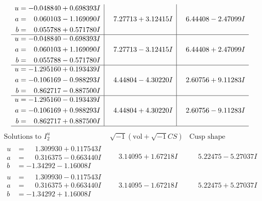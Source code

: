 \documentclass[1p]{elsarticle_modified}
\theoremstyle{definition}
\newcommand{\I}{\sqrt{-1}}
\begin{document}
$$\begin{array}{c|c|c}
\begin{aligned}
u &= -0.048840 + 0.698393 I \\
a &= \phantom{-}0.060103 - 1.169090 I \\
b &= \phantom{-}0.055788 + 0.571780 I\end{aligned}
 & \phantom{-}7.27713 + 3.12415 I & \phantom{-}6.44408 - 2.47099 I \\ \hline\begin{aligned}
u &= -0.048840 - 0.698393 I \\
a &= \phantom{-}0.060103 + 1.169090 I \\
b &= \phantom{-}0.055788 - 0.571780 I\end{aligned}
 & \phantom{-}7.27713 - 3.12415 I & \phantom{-}6.44408 + 2.47099 I \\ \hline\begin{aligned}
u &= -1.295160 + 0.193439 I \\
a &= -0.106169 - 0.988293 I \\
b &= \phantom{-}0.862717 - 0.887500 I\end{aligned}
 & \phantom{-}4.44804 - 4.30220 I & \phantom{-}2.60756 + 9.11283 I \\ \hline\begin{aligned}
u &= -1.295160 - 0.193439 I \\
a &= -0.106169 + 0.988293 I \\
b &= \phantom{-}0.862717 + 0.887500 I\end{aligned}
 & \phantom{-}4.44804 + 4.30220 I & \phantom{-}2.60756 - 9.11283 I\\
 \hline 
 \end{array}$$\newpage$$\begin{array}{c|c|c}  
\text{Solutions to }I^u_{2}& \I (\text{vol} + \sqrt{-1}CS) & \text{Cusp shape}\\
 \hline 
\begin{aligned}
u &= \phantom{-}1.309930 + 0.117543 I \\
a &= \phantom{-}0.316375 - 0.663440 I \\
b &= -1.34292 - 1.16008 I\end{aligned}
 & \phantom{-}3.14095 + 1.67218 I & \phantom{-}5.22475 - 5.27037 I \\ \hline\begin{aligned}
u &= \phantom{-}1.309930 - 0.117543 I \\
a &= \phantom{-}0.316375 + 0.663440 I \\
b &= -1.34292 + 1.16008 I\end{aligned}
 & \phantom{-}3.14095 - 1.67218 I & \phantom{-}5.22475 + 5.27037 I \\ \hline\begin{aligned}

\end{aligned}
\end{array}$$
\end{document}
